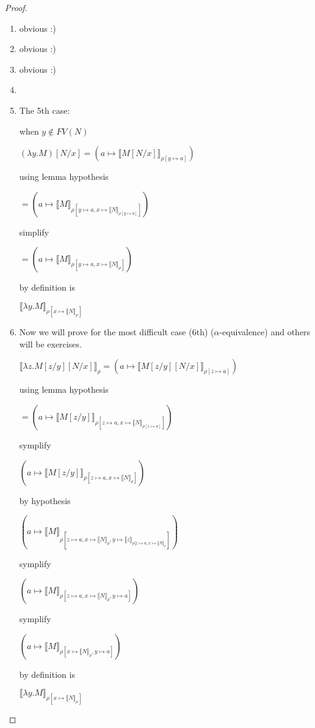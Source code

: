 \documentclass[a4paper,10pt]{book}
\newcommand{\sem}[2]{ \llbracket#1\rrbracket_{#2} }
\begin{document}
\begin{proof}
 
\begin{enumerate}
 \item obvious :)
 \item obvious :)
 \item obvious :)
 \item 
 \item The 5th case: %

when $y \not\in FV(N)$

$(\lambda y . M)[N/x] = (a \mapsto \llbracket  M[N/x] \rrbracket_{\rho[y \mapsto a]})$

using lemma hypothesis

$ = (a \mapsto \sem{M}{\rho[y \mapsto a, x \mapsto \sem{N}{\rho[y \mapsto a] }]})$

simplify

$ = (a \mapsto \sem{M}{\rho[y \mapsto a, x \mapsto \sem{N}{\rho}]})$

by definition is 

$\llbracket \lambda y . M \rrbracket_{\rho[x \mapsto \llbracket N\rrbracket_\rho]}$

\item %
Now we will prove for the most difficult case (6th) ($\alpha$-equivalence) and others will be exercises.

$\llbracket \lambda z . M[z/y][N/x]\rrbracket_\rho = (a \mapsto 
 \llbracket  M[z/y][N/x] \rrbracket_{\rho[z \mapsto a]})$

using lemma hypothesis
 
$ = (a \mapsto \llbracket M[z/y]\rrbracket_{\rho[z \mapsto a, x \mapsto \llbracket N \rrbracket_{\rho[z \mapsto a] }]})$

symplify

$(a \mapsto \llbracket M[z/y]\rrbracket_{\rho[z \mapsto a, x \mapsto \llbracket N \rrbracket_\rho ]})$

by hypothesis

$(a \mapsto \llbracket M\rrbracket_{\rho[z \mapsto a, x \mapsto \sem{N}{\rho}, y \mapsto\sem{z}{\rho[z \mapsto a, x \mapsto \sem{N}{\rho} }]})$

symplify

$(a \mapsto \sem{M}{\rho[z \mapsto a, x \mapsto \sem{N}{\rho}, y \mapsto a]})$

symplify

$(a \mapsto \sem{M}{\rho[         x \mapsto \sem{N}{\rho}, y\mapsto a]})$

by definition is 

$\llbracket \lambda y . M \rrbracket_{\rho[x \mapsto \llbracket N\rrbracket_\rho]}$

\end{enumerate}

\end{proof}
\end{document}

